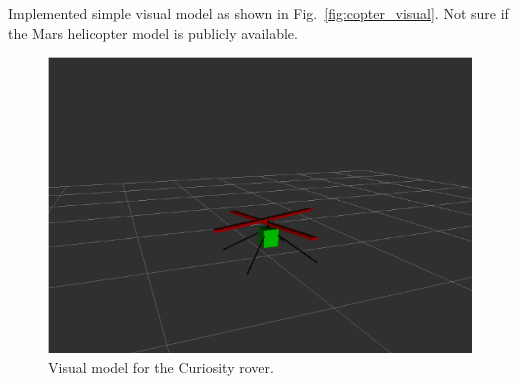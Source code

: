 \documentclass[conference]{IEEEtran}
\newcommand{\kyon}[1]{{\color{cyan} #1}}
\begin{document}
\kyon{Implemented simple visual model as shown in Fig.~\ref{fig:copter_visual}. Not sure if the Mars helicopter model is publicly available.}

\begin{figure}
    \centering
    \includegraphics[width=\textwidth]{figs/report6/copter_visual.png}
    \caption{Visual model for the Curiosity rover.}
    \label{fig:msl_visual}
\end{figure}
\end{document}

